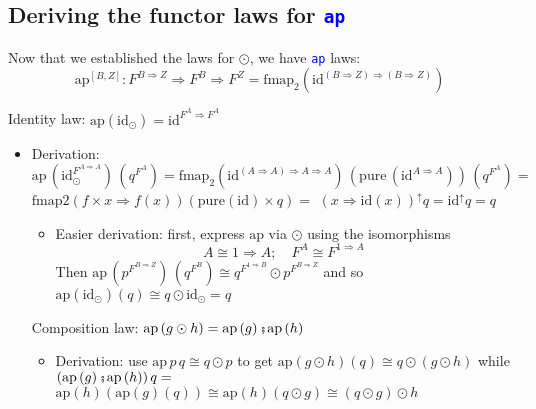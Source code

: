 \subsection{Deriving the functor laws for \texttt{\textcolor{blue}{\footnotesize{}ap}} }

\vspace{-0.10cm}Now that we established the laws for $\odot$, we
have \texttt{\textcolor{blue}{\footnotesize{}ap}} laws:
\[
\text{ap}^{[B,Z]}:F^{B\Rightarrow Z}\Rightarrow F^{B}\Rightarrow F^{Z}=\text{fmap}_{2}\left(\text{id}^{\left(B\Rightarrow Z\right)\Rightarrow\left(B\Rightarrow Z\right)}\right)
\]

Identity law: $\text{ap}\left(\text{id}_{\odot}\right)=\text{id}^{F^{A}\Rightarrow F^{A}}$
\begin{itemize}
\item Derivation:{\footnotesize{} $\text{ap}\,(\text{id}_{\odot}^{F^{A\Rightarrow A}})\,(q^{F^{A}})=\text{fmap}_{2}(\text{id}^{\left(A\Rightarrow A\right)\Rightarrow A\Rightarrow A})\,(\text{pure}\,(\text{id}^{A\Rightarrow A}))\,(q^{F^{A}})=$}
{\footnotesize{}$\text{fmap2}\left(f\times x\Rightarrow f(x)\right)\left(\text{pure}\left(\text{id}\right)\times q\right)=$
$\left(x\Rightarrow\text{id}(x)\right)^{\uparrow}q=\text{id}^{\uparrow}q=q$} 
\begin{itemize}
\item Easier derivation: first, express {\footnotesize{}$\text{ap}$} via
$\odot$ using the isomorphisms{\footnotesize{}
\[
A\cong1\Rightarrow A;\quad F^{A}\cong F^{1\Rightarrow A}
\]
}Then {\footnotesize{}$\text{ap}\,(p^{F^{B\Rightarrow Z}})\,(q^{F^{B}})\cong q^{F^{1\Rightarrow B}}\odot p^{F^{B\Rightarrow Z}}$}
and so {\footnotesize{}$\text{ap}\left(\text{id}_{\odot}\right)\left(q\right)\cong q\odot\text{id}_{\odot}=q$}{\footnotesize\par}
\end{itemize}
Composition law: $\text{ap}\left(g\odot h\right)=\text{ap}\left(g\right)\bef\text{ap}\left(h\right)$
\begin{itemize}
\item Derivation: use $\text{ap}\,p\,q\cong q\odot p$ to get {\footnotesize{}$\text{ap}\left(g\odot h\right)\left(q\right)\cong q\odot\left(g\odot h\right)$}
while {\footnotesize{}$\left(\text{ap}\left(g\right)\bef\text{ap}\left(h\right)\right)q=$
$\text{ap}\left(h\right)\left(\text{ap}\left(g\right)\left(q\right)\right)\cong\text{ap}\left(h\right)\left(q\odot g\right)\cong\left(q\odot g\right)\odot h$}{\footnotesize\par}
\end{itemize}
\end{itemize}


